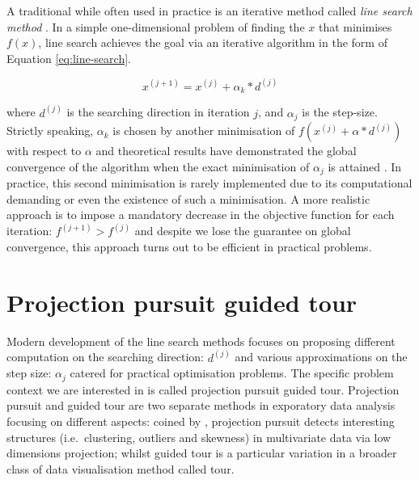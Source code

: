 \documentclass[12pt]{article}
\begin{document}
A traditional while often used in practice is an iterative method called \emph{line search method} \citep{fletcher2013practical}. In a simple one-dimensional problem of finding the \(x\) that minimises \(f(x)\), line search achieves the goal via an iterative algorithm in the form of Equation \ref{eq:line-search}.

\begin{equation}
x^{(j + 1)} = x^{(j)} + \alpha_k* d^{(j)}
\label{eq:line-search}
\end{equation}

where \(d^{(j)}\) is the searching direction in iteration \(j\), and \(\alpha_j\) is the step-size. Strictly speaking, \(\alpha_k\) is chosen by another minimisation of \(f(x^{(j)} + \alpha* d^{(j)})\) with respect to \(\alpha\) and theoretical results have demonstrated the global convergence of the algorithm when the exact minimisation of \(\alpha_j\) is attained \citep{curry1944method}. In practice, this second minimisation is rarely implemented due to its computational demanding or even the existence of such a minimisation. A more realistic approach is to impose a mandatory decrease in the objective function for each iteration: \(f^{(j+1)}> f^{(j)}\) and despite we lose the guarantee on global convergence, this approach turns out to be efficient in practical problems.

\hypertarget{tour}{%
\section{Projection pursuit guided tour}\label{tour}}

Modern development of the line search methods focuses on proposing different computation on the searching direction: \(d^{(j)}\) and various approximations on the step size: \(\alpha_j\) catered for practical optimisation problems. The specific problem context we are interested in is called projection pursuit guided tour.
Projection pursuit and guided tour are two separate methods in exporatory data analysis focusing on different aspects: coined by \citet{friedman1974projection}, projection pursuit detects interesting structures (i.e.~clustering, outliers and skewness) in multivariate data via low dimensions projection; whilst guided tour is a particular variation in a broader class of data visualisation method called tour.
\end{document}
